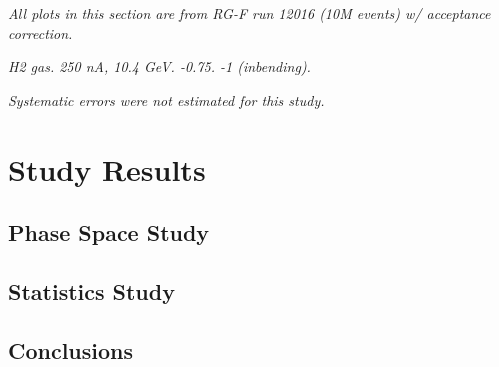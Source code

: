 \section*{}
\begin{frame}{}
    \label{12.00::study_results}
    \centering \Huge{}

    \vspace{9pt}

    \small{\textit{
        All plots in this section are from RG-F run 12016 (10M events) w/ acceptance correction.
    }}

    \small{\textit{
         H2 gas.
         250 nA, 10.4 GeV.
         -0.75.
         -1 (inbending).
    }}

    \small{\textit{
        Systematic errors were not estimated for this study.
    }}
\end{frame}

\section{Study Results}
\subsection{Phase Space Study}


\subsection{Statistics Study}


\subsection{Conclusions}

